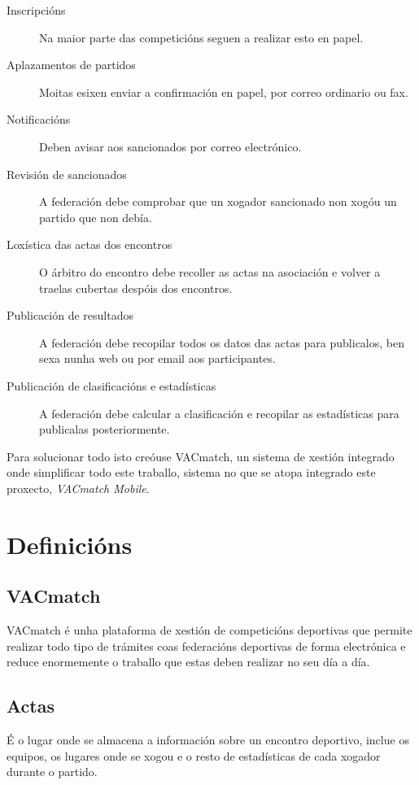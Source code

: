     \begin{description}
     \item [Inscripcións] Na maior parte das competicións seguen a realizar esto en papel.
     \item [Aplazamentos de partidos] Moitas esixen enviar a confirmación en papel, por 
correo ordinario ou fax.
     \item [Notificacións] Deben avisar aos sancionados por correo electrónico.
     \item [Revisión de sancionados] A federación debe comprobar que un xogador 
sancionado non xogóu un partido que non debía.
     \item [Loxística das actas dos encontros] O árbitro do encontro debe recoller as 
actas na asociación e volver a traelas cubertas despóis dos encontros.
     \item [Publicación de resultados] A federación debe recopilar todos os datos das 
actas para publicalos, ben sexa nunha web ou por email aos participantes.
     \item [Publicación de clasificacións e estadísticas] A federación debe calcular a 
clasificación e recopilar as estadísticas para publicalas posteriormente.
    \end{description}

    Para solucionar todo isto creóuse VACmatch, un sistema de xestión integrado onde 
simplificar todo este traballo, sistema no que se atopa integrado este proxecto, 
\emph{VACmatch Mobile}.

    \section{Definicións}

      \subsection{VACmatch}
    VACmatch é unha plataforma de xestión de competicións deportivas que permite realizar 
todo tipo de trámites coas federacións deportivas de forma electrónica e reduce 
enormemente o traballo que estas deben realizar no seu día a día.

      \subsection{Actas}
    É o lugar onde se almacena a información sobre un encontro deportivo, inclue os 
equipos, os lugares onde se xogou e o resto de estadísticas de cada xogador durante o 
partido.


